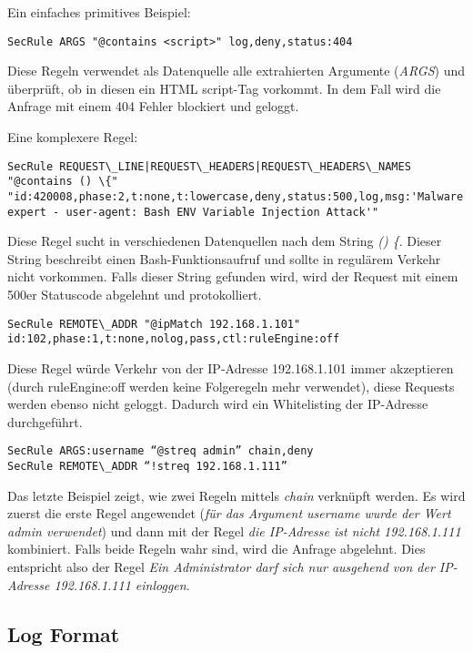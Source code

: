 Ein einfaches primitives Beispiel:

\begin{verbatim}
SecRule ARGS "@contains <script>" log,deny,status:404
\end{verbatim}

Diese Regeln verwendet als Datenquelle alle extrahierten Argumente (\textit{ARGS}) und überprüft, ob in diesen ein HTML script-Tag vorkommt. In dem Fall wird die Anfrage mit einem 404 Fehler blockiert und geloggt.

Eine komplexere Regel:

\begin{verbatim}
SecRule REQUEST\_LINE|REQUEST\_HEADERS|REQUEST\_HEADERS\_NAMES "@contains () \{" "id:420008,phase:2,t:none,t:lowercase,deny,status:500,log,msg:'Malware expert - user-agent: Bash ENV Variable Injection Attack'"
\end{verbatim}

Diese Regel sucht in verschiedenen Datenquellen nach dem String \textit{() \{}. Dieser String beschreibt einen Bash-Funktionsaufruf und sollte in regulärem Verkehr nicht vorkommen. Falls dieser String gefunden wird, wird der Request mit einem 500er Statuscode abgelehnt und protokolliert.

\begin{verbatim}
SecRule REMOTE\_ADDR "@ipMatch 192.168.1.101" id:102,phase:1,t:none,nolog,pass,ctl:ruleEngine:off
\end{verbatim}

Diese Regel würde Verkehr von der IP-Adresse 192.168.1.101 immer akzeptieren (durch ruleEngine:off werden keine Folgeregeln mehr verwendet), diese Requests werden ebenso nicht geloggt. Dadurch wird ein Whitelisting der IP-Adresse durchgeführt.

\begin{verbatim}
SecRule ARGS:username “@streq admin” chain,deny
SecRule REMOTE\_ADDR “!streq 192.168.1.111”
\end{verbatim}

Das letzte Beispiel zeigt, wie zwei Regeln mittels \textit{chain} verknüpft werden. Es wird zuerst die erste Regel angewendet (\textit{für das Argument username wurde der Wert admin verwendet}) und dann mit der Regel \textit{die IP-Adresse ist nicht 192.168.1.111} kombiniert. Falls beide Regeln wahr sind, wird die Anfrage abgelehnt. Dies entspricht also der Regel \textit{Ein Administrator darf sich nur ausgehend von der IP-Adresse 192.168.1.111 einloggen}.

\subsection{Log Format}

